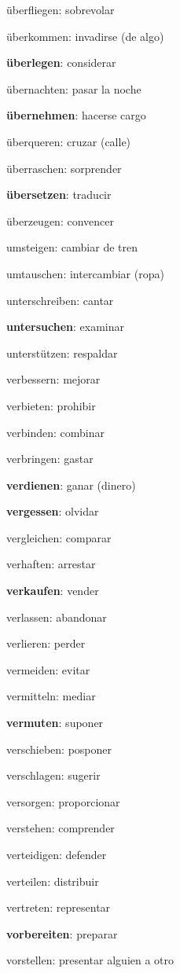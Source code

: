 \begin{multicols}{2}
\begin{myitemize}
\item überfliegen: sobrevolar
\item überkommen: invadirse (de algo)
\item \textbf{überlegen}: considerar
\item übernachten: pasar la noche
\item \textbf{übernehmen}: hacerse cargo
\item überqueren: cruzar (calle)
\item überraschen: sorprender
\item \textbf{übersetzen}: traducir
\item überzeugen: convencer
\item umsteigen: cambiar de tren
\item umtauschen: intercambiar (ropa)
\item unterschreiben: cantar
\item \textbf{untersuchen}: examinar
\item unterstützen: respaldar
\item verbessern: mejorar
\item verbieten: prohibir
\item verbinden: combinar
\item verbringen: gastar
\item \textbf{verdienen}: ganar (dinero)
\item \textbf{vergessen}: olvidar
\item vergleichen: comparar
\item verhaften: arrestar
\item \textbf{verkaufen}: vender
\item verlassen: abandonar
\item verlieren: perder
\item vermeiden: evitar
\item vermitteln: mediar
\item \textbf{vermuten}: suponer
\item verschieben: posponer
\item verschlagen: sugerir
\item versorgen: proporcionar
\item verstehen: comprender
\item verteidigen: defender
\item verteilen: distribuir
\item vertreten: representar
\item \textbf{vorbereiten}: preparar
\item vorstellen: presentar alguien a otro

\end{myitemize}
\end{multicols}
